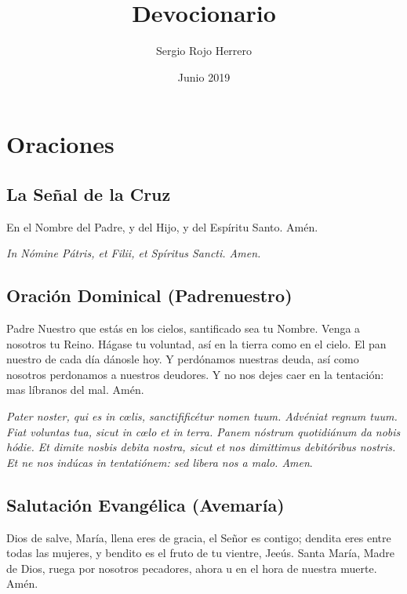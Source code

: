 \documentclass[a4paper,11pt, oneside]{report}
\title{Devocionario}
\author{Sergio Rojo Herrero}
\date{Junio 2019}
\begin{document}
  
  \begin{titlepage}
    \maketitle    
  \end{titlepage}

  \tableofcontents{}

  \newpage

  \chapter{Oraciones}

    \section{La Señal de la Cruz\cite{frater:oraciones}}
      En el Nombre del Padre, y del Hijo, y del Espíritu Santo. Amén.

      \medskip

      \textit{In Nómine Pátris, et Filii, et Spíritus Sancti. Amen.}

    \section{Oración Dominical (Padrenuestro)}
      
      Padre Nuestro que estás en los cielos, santificado sea tu Nombre. Venga a nosotros tu Reino. Hágase tu voluntad, así en la tierra como
      en el cielo. El pan nuestro de cada día dánosle hoy. Y perdónamos nuestras deuda, así como nosotros perdonamos a nuestros deudores.
      Y no nos dejes caer en la tentación: mas líbranos del mal. Amén.
      
      \medskip

      \textit{Pater noster, qui es in c{\oe}lis, sanctifificétur nomen tuum. Advéniat regnum tuum. Fiat voluntas tua, sicut in c{\oe}lo et in terra.
      Panem nóstrum quotidiánum da nobis hódie. Et dimite nosbis debita nostra, sicut et nos dimittimus debitóribus nostris. Et ne nos indúcas
      in tentatiónem: sed libera nos a malo. Amen}.\cite{frater:oraciones}

    \section{Salutación Evangélica (Avemaría)}
      Dios de salve, María, llena eres de gracia, el Señor es contigo; dendita eres entre todas las mujeres, y bendito es el fruto de tu
      vientre, Jeeús. Santa María, Madre de Dios, ruega por nosotros pecadores, ahora u en el hora de nuestra muerte. Amén.
      
\end{document}
